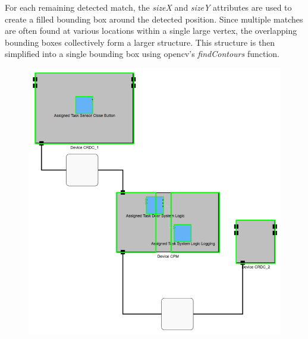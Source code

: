 For each remaining detected match, the \textit{sizeX} and \textit{sizeY} attributes are used to create a filled bounding box around the detected position. Since multiple matches are often found at various locations within a single large vertex, the overlapping bounding boxes collectively form a larger structure. This structure is then simplified into a single bounding box using \acrshort{opencv}'s \textit{findContours} function.
\begin{figure}[htb]
    \centering
    \begin{minipage}[b]{0.36\textwidth}
        \includegraphics[width=\textwidth]{pictures/many_templates_before.png}
    \end{minipage}
    \hfill
    \begin{minipage}[b]{0.36\textwidth}

\end{minipage}
\end{figure}
